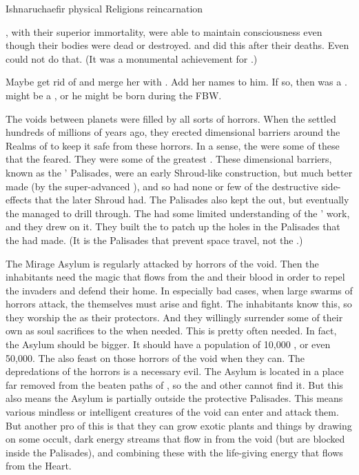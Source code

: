 Ishnaruchaefir physical
Religions reincarnation



\Dragons, with their superior immortality, were able to maintain consciousness even though their bodies were dead or destroyed. 
\Sethicus and \Tiamat did this after their deaths.
Even \resphain could not do that. (It was a monumental achievement for \Shiaraid.)

Maybe get rid of \Tiamat and merge her with \Sethicus.
Add her names to him.
If so, then \Nexagglachel was a \Primordial.
\Ishnaruchaefir might be a \Primordial, or he might be born during the FBW.

The voids between planets were filled by all sorts of horrors.
When the \voyagers settled \Miith hundreds of millions of years ago, they erected dimensional barriers around the Realms of \Miith to keep it safe from these horrors.
In a sense, the \xss were some of these  that the \voyagers feared.
They were some of the greatest .
These dimensional barriers, known as the \Voyagers' Palisades, were an early Shroud-like construction, but much better made (by the super-advanced \voyagers), and so had none or few of the destructive side-effects that the later Shroud had.
The Palisades also kept the \banes out, but eventually the \banes managed to drill through.
The \ophidians had some limited understanding of the \voyagers' work, and they drew on it.
They built the \CrystalSphere to patch up the holes in the Palisades that the \banes had made.
(It is the Palisades that prevent space travel, not the \CrystalSphere.)

The Mirage Asylum is regularly attacked by horrors of the void.
Then the inhabitants need the magic that flows from the \dragons and their blood in order to repel the invaders and defend their home.
In especially bad cases, when large swarms of horrors attack, the \dragons themselves must arise and fight.
The inhabitants know this, so they worship the \dragons as their protectors.
And they willingly surrender some of their own as soul sacrifices to the \dragons when needed. 
This is pretty often needed.
In fact, the Asylum should be bigger.
It should have a population of 10,000 \humanoids, or even 50,000.
The \dragons also feast on those horrors of the void when they can.
The depredations of the horrors is a necessary evil.
The Asylum is located in a place far removed from the beaten paths of \Miith, so the \resphain and other \Miithians cannot find it.
But this also means the Asylum is partially outside the protective Palisades.
This means various mindless or intelligent creatures of the void can enter and attack them.
But another pro of this is that they can grow exotic plants and things by drawing on some occult, dark energy streams that flow in from the void (but are blocked inside the Palisades), and combining these with the life-giving energy that flows from the Heart.

